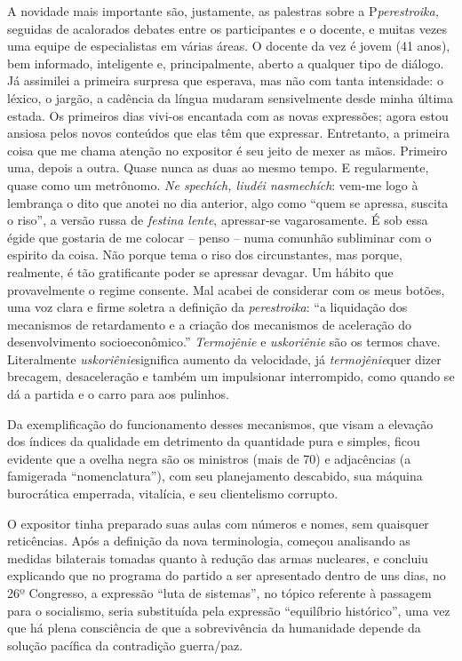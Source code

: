 A novidade mais importante são, justamente, as palestras sobre a
P\emph{perestroika,} seguidas de acalorados debates entre os
participantes e o docente, e muitas vezes uma equipe de especialistas em
várias áreas. O docente da vez é jovem (41 anos), bem informado,
inteligente e, principalmente, aberto a qualquer tipo de diálogo. Já
assimilei a primeira surpresa que esperava, mas não com tanta
intensidade: o léxico, o jargão, a cadência da língua mudaram
sensivelmente desde minha última estada. Os primeiros dias vivi-os
encantada com as novas expressões; agora estou ansiosa pelos novos
conteúdos que elas têm que expressar. Entretanto, a primeira coisa que
me chama atenção no expositor é seu jeito de mexer as mãos. Primeiro
uma, depois a outra. Quase nunca as duas ao mesmo tempo. E regularmente,
quase como um metrônomo. \emph{Ne spechích, liudéi nasmechích}: vem-me
logo à lembrança o dito que anotei no dia anterior, algo como ``quem se
apressa, suscita o riso'', a versão russa de \emph{festina lente},
apressar-se vagarosamente. É sob essa égide que gostaria de me colocar
-- penso -- numa comunhão subliminar com o espirito da coisa. Não porque
tema o riso dos circunstantes, mas porque, realmente, é tão gratificante
poder se apressar devagar. Um hábito que provavelmente o regime
consente. Mal acabei de considerar com os meus botões, uma voz clara e
firme soletra a definição da \emph{perestroika}: ``a liquidação dos
mecanismos de retardamento e a criação dos mecanismos de aceleração do
desenvolvimento socioeconômico.'' \emph{Termojênie} e \emph{uskoriênie}
são os termos chave. Literalmente \emph{uskoriênie}significa aumento da
velocidade, já \emph{termojênie}quer dizer brecagem, desaceleração e
também um impulsionar interrompido, como quando se dá a partida e o
carro para aos pulinhos.

Da exemplificação do funcionamento desses mecanismos, que visam a
elevação dos índices da qualidade em detrimento da quantidade pura e
simples, ficou evidente que a ovelha negra são os ministros (mais de 70)
e adjacências (a famigerada ``nomenclatura''), com seu planejamento
descabido, sua máquina burocrática emperrada, vitalícia, e seu
clientelismo corrupto.

O expositor tinha preparado suas aulas com números e nomes, sem
quaisquer reticências. Após a definição da nova terminologia, começou
analisando as medidas bilaterais tomadas quanto à redução das armas
nucleares, e concluiu explicando que no programa do partido a ser
apresentado dentro de uns dias, no 26º Congresso, a expressão ``luta de
sistemas'', no tópico referente à passagem para o socialismo, seria
substituída pela expressão ``equilíbrio histórico'', uma vez que há
plena consciência de que a sobrevivência da humanidade depende da
solução pacífica da contradição guerra/paz.

